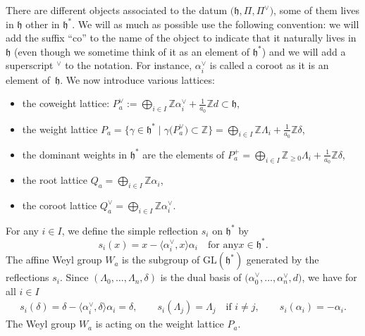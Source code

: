 \documentclass[10pt,a4paper]{amsart}
\numberwithin{equation}{section}
\newcommand{\al}{\alpha}
\newcommand{\ga}{\gamma}
\newcommand{\La}{\Lambda}
\newcommand{\fh}{\mathfrak{h}}
\newcommand{\Z}{\mathbb{Z}}
\begin{document}
There are different objects associated to the datum $\bigl(\fh,\Pi,\Pi^\vee\bigr)$, some of them lives in $\fh$ other in $\fh^\ast$. We will as much as possible use the following convention: we will add the suffix ``co'' to the name of the object to indicate that it naturally lives in $\fh$ (even though we sometime think of it as an element of $\fh^\ast$) and we will add a superscript $^\vee$ to the notation. For instance, $\al_i^\vee$ is called a coroot as it is an element of~$\fh$. We now introduce various lattices:
\begin{itemize}
\item  the coweight lattice: $P_a^\vee := \bigoplus_{i\in I} \Z \al_i^\vee +\frac{1}{a_0}\Z d\subset \fh$,
\item  the weight lattice $P_a = \bigl\{\ga\in \fh^\ast\mid \ga\bigl(P_a^\vee\bigr) \subset \Z\bigr\} = \bigoplus_{i\in I} \Z\La_i +\frac{1}{a_0} \Z\delta$,
 \item  the dominant weights in $\fh^\ast$ are the elements of $P^+_a = \bigoplus_{i\in I} \Z_{\geq 0}\La_i +\frac{1}{a_0} \Z\delta$,
\item  the root lattice $Q_a=\bigoplus_{i\in I} \Z \al_i$,
\item  the coroot lattice $Q_a^\vee=\bigoplus_{i\in I} \Z \al^\vee_i$.
\end{itemize}
For any $i\in I$, we define the simple reflection $s_{i}$ on $\fh^\ast$ by
\begin{equation*}
s_{i}(x)=x-\bigl\langle\alpha_{i}^{\vee},x\bigr\rangle\alpha_{i}\quad \text{for any
}x\in \fh^\ast . \label{defSi}
\end{equation*}
The affine Weyl group $W_{a}$ is the subgroup of $\mathrm{GL}(\mathfrak{h}^{\ast})$ generated
by the reflections $s_{i}$. Since $(\La_0,\dots,\La_n,\delta)$ is the dual basis of $\bigl(\al_0^\vee,\dots,\al_n^\vee,d\bigr)$, we have for all $i\in I$
\begin{align*}
s_i(\delta)=\delta - \bigl\langle\alpha_{i}^{\vee},\delta\bigr\rangle \al_i = \delta,\qquad
s_i(\La_j)= \La_j \quad\text{if $i\neq j$},\qquad
s_i(\al_i)= -\al_i.
\end{align*}
The Weyl group $W_a$ is acting on the weight
lattice $P_{a}$.
\end{document}
